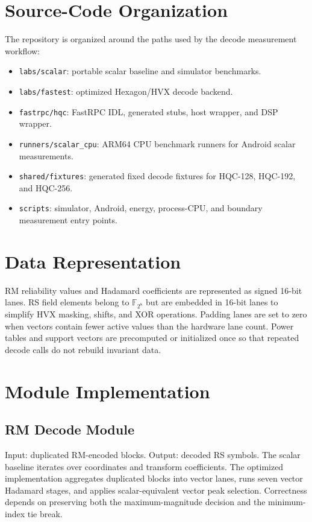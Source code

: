 \documentclass[12pt,a4paper]{report}
\newcommand{\gf}{\mathbb{F}_{2^8}}
\begin{document}
\section{Source-Code Organization}
The repository is organized around the paths used by the decode measurement workflow:
\begin{itemize}
  \item \texttt{labs/scalar}: portable scalar baseline and simulator benchmarks.
  \item \texttt{labs/fastest}: optimized Hexagon/HVX decode backend.
  \item \texttt{fastrpc/hqc}: FastRPC IDL, generated stubs, host wrapper, and DSP wrapper.
  \item \texttt{runners/scalar\_cpu}: ARM64 CPU benchmark runners for Android scalar measurements.
  \item \texttt{shared/fixtures}: generated fixed decode fixtures for HQC-128, HQC-192, and HQC-256.
  \item \texttt{scripts}: simulator, Android, energy, process-CPU, and boundary measurement entry points.
\end{itemize}

\section{Data Representation}
RM reliability values and Hadamard coefficients are represented as signed 16-bit lanes. RS field elements belong to \(\gf\) but are embedded in 16-bit lanes to simplify HVX masking, shifts, and XOR operations. Padding lanes are set to zero when vectors contain fewer active values than the hardware lane count. Power tables and support vectors are precomputed or initialized once so that repeated decode calls do not rebuild invariant data.

\section{Module Implementation}
\subsection{RM Decode Module}
Input: duplicated RM-encoded blocks. Output: decoded RS symbols. The scalar baseline iterates over coordinates and transform coefficients. The optimized implementation aggregates duplicated blocks into vector lanes, runs seven vector Hadamard stages, and applies scalar-equivalent vector peak selection. Correctness depends on preserving both the maximum-magnitude decision and the minimum-index tie break.
\end{document}
